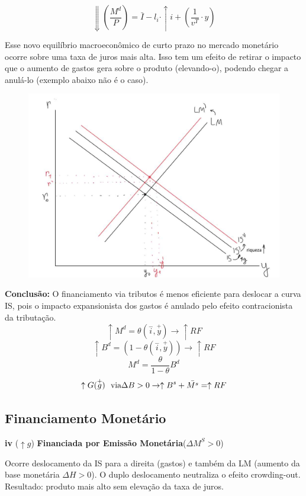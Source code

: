 \documentclass[a4paper,12pt]{article}[abntex2]
\begin{document}
\[
\Downarrow \left( \frac{M^d}{P} \right) = \bar{I} - l_i \cdot \uparrow i + \left( \frac{1}{v^T} \cdot y \right)
\]

Esse novo equilíbrio macroeconômico de curto prazo no mercado monetário ocorre sobre uma taxa de juros mais alta. Isso tem um efeito de retirar o impacto que o aumento de gastos gera sobre o produto (elevando-o), podendo chegar a anulá-lo (exemplo abaixo não é o caso).

\begin{figure}[H]
    \centering
    \includegraphics[width=0.7\linewidth]{Imagens/a18i4.png}
\end{figure}

\textbf{Conclusão:} O financiamento via tributos é menos eficiente para deslocar a curva IS, pois o impacto expansionista dos gastos é anulado pelo efeito contracionista da tributação.
\[
\uparrow M^d=\theta(\overset{-}{i},\overset{+}{y})\rightarrow\uparrow RF
\]
\[
\uparrow B^d=(1-\theta(\overset{-}{i},\overset{+}{y}))\rightarrow\uparrow RF
\]
\[
M^d=\frac{\theta}{1-\theta}B^d
\]
\[
\uparrow G(\overset{+}{g}) \ \ \text{via} \ \\ \Delta B>0 \rightarrow \uparrow B^s + \bar{M^s}=\uparrow RF
\]


\subsection{\textbf{Financiamento Monetário}}
\textbf{iv} ($\uparrow g$) \quad \textbf{Financiada por Emissão Monetária}(\(\Delta M^S>0\))

Ocorre deslocamento da IS para a direita (gastos) e também da LM (aumento da base monetária $\Delta H > 0$). O duplo deslocamento neutraliza o efeito crowding-out. Resultado: produto mais alto sem elevação da taxa de juros.
\end{document}
